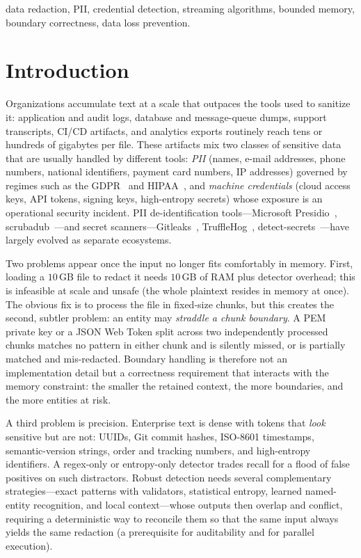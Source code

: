 \documentclass[conference]{IEEEtran}
\begin{document}
\begin{IEEEkeywords}
data redaction, PII, credential detection, streaming algorithms,
bounded memory, boundary correctness, data loss prevention.
\end{IEEEkeywords}

\section{Introduction}

Organizations accumulate text at a scale that outpaces the tools used to sanitize
it: application and audit logs, database and message-queue dumps, support
transcripts, CI/CD artifacts, and analytics exports routinely reach tens or
hundreds of gigabytes per file. These artifacts mix two classes of sensitive
data that are usually handled by different tools: \emph{PII}
(names, e-mail addresses, phone numbers, national identifiers, payment card
numbers, IP addresses) governed by regimes such as the GDPR~\cite{gdpr2016} and
HIPAA~\cite{hipaa}, and \emph{machine credentials}
(cloud access keys, API tokens, signing keys, high-entropy secrets) whose
exposure is an operational security incident. PII de-identification
tools---Microsoft Presidio~\cite{presidio}, scrubadub~\cite{scrubadub}---and
secret scanners---Gitleaks~\cite{gitleaks}, TruffleHog~\cite{trufflehog},
detect-secrets~\cite{detectsecrets}---have largely evolved as separate ecosystems.

Two problems appear once the input no longer fits comfortably in memory.
First, loading a $10$\,GB file to redact it needs $10$\,GB of RAM plus
detector overhead; this is infeasible at scale and unsafe (the whole plaintext
resides in memory at once). The obvious fix is to process the file in fixed-size
chunks, but this creates the second, subtler problem: an entity may
\emph{straddle a chunk boundary}. A PEM private key or a JSON Web Token split
across two independently processed chunks matches no pattern in either chunk and
is silently missed, or is partially matched and mis-redacted. Boundary handling
is therefore not an implementation detail but a correctness requirement that
interacts with the memory constraint: the smaller the retained context, the more
boundaries, and the more entities at risk.

A third problem is precision. Enterprise text is dense with tokens that
\emph{look} sensitive but are not: UUIDs, Git commit hashes, ISO-8601
timestamps, semantic-version strings, order and tracking numbers, and
high-entropy identifiers. A regex-only or entropy-only detector trades recall
for a flood of false positives on such distractors. Robust detection needs
several complementary strategies---exact patterns with validators, statistical
entropy, learned named-entity recognition, and local context---whose outputs
then overlap and conflict, requiring a deterministic way to reconcile them so
that the same input always yields the same redaction (a prerequisite for
auditability and for parallel execution).
\end{document}
